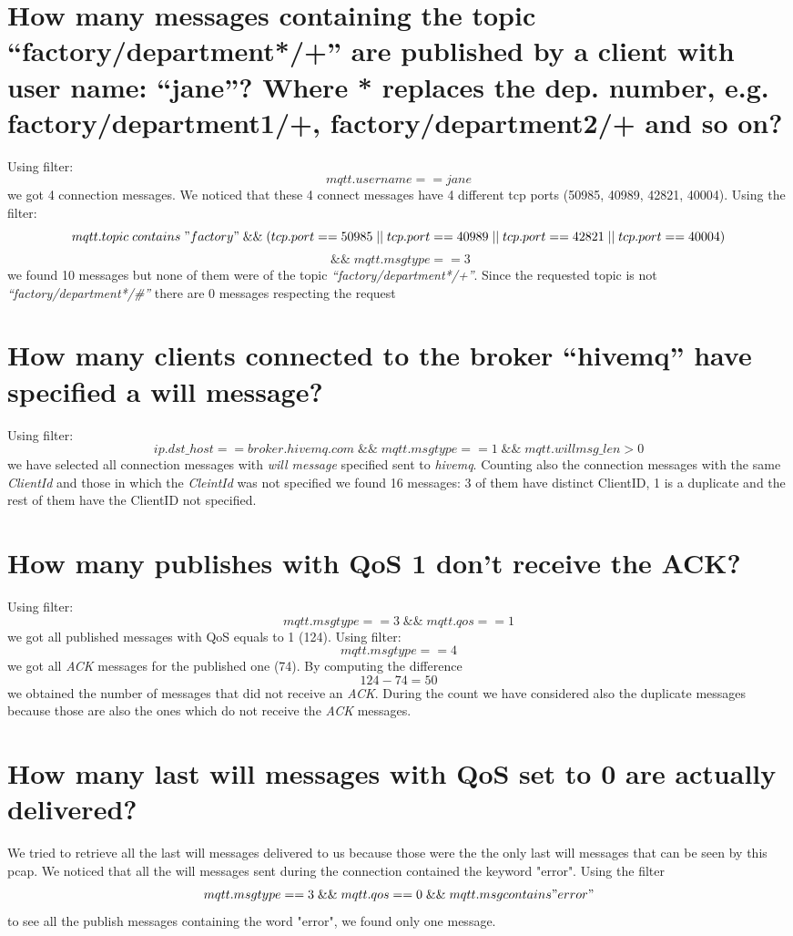 \documentclass{article}
\begin{document}
\section{How many messages containing the topic
“factory/department*/+” are published by a client with
user name: “jane”? Where * replaces the dep. number,
e.g. factory/department1/+, factory/department2/+
and so on?}
Using filter: \[ mqtt.username == jane\] we got 4 connection messages. We noticed that these 4 connect messages have 4 different tcp ports (50985, 40989, 42821, 40004). \hfill \break
Using the filter: \[ mqtt.topic \; contains \; "factory" \; \&\& \; ( tcp.port == 50985 \; || \; tcp.port == 40989 \; || \; tcp.port == 42821 \; || \; tcp.port == 40004 )\] \[  \; \&\& \; mqtt.msgtype == 3 \]
we found 10 messages but none of them were of the topic \textit{“factory/department*/+”}. \hfill \break
Since the requested topic is not \textit{“factory/department*/\#”} there are 0 messages respecting the request

\section{How many clients connected to the broker “hivemq”
have specified a will message?}
Using filter: \[ ip.dst\_host == broker.hivemq.com \; \&\& \; mqtt.msgtype == 1 \; \&\& \; mqtt.willmsg\_len > 0 \] we have selected
all connection messages with \textit{will message} specified sent to \textit{hivemq}. Counting also the connection messages with the same \textit{ClientId} and those in which the \textit{CleintId} was not specified we found 16 messages: 3 of them have distinct ClientID, 1 is a duplicate and the rest of them have the ClientID not specified.

\section{How many publishes with QoS 1 don't receive the ACK?}
Using filter: \[ mqtt.msgtype == 3 \; \&\& \; mqtt.qos == 1 \] we got all published messages with QoS equals to 1 (124). \hfill \break
Using filter: \[ mqtt.msgtype == 4 \] we got all \textit{ACK} messages for the published one (74). \hfill \break
By computing the difference \[ 124-74 = 50\] we obtained the number of messages that did not receive an \textit{ACK}. \hfill \break
During the count we have considered also the duplicate messages because those are also the ones which do not receive the \textit{ACK} messages.

\section{How many last will messages with QoS set to 0 are
actually delivered?}
We tried to retrieve all the last will messages delivered to us because those were the the only last will messages that can be seen by this pcap. We noticed that all the will messages sent during the connection contained the keyword "error".\hfill\break
Using the filter \[ mqtt.msgtype == 3 \; \&\& \; mqtt.qos == 0 \; \&\& \; mqtt.msg contains "error" \] to see all the publish messages containing the word "error", we found only one message.
\end{document}
